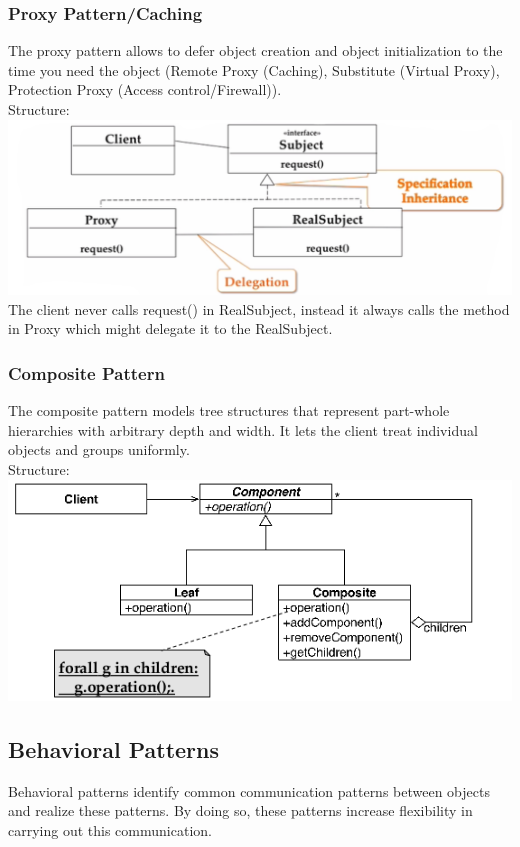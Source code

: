 \subsubsection{Proxy Pattern/Caching}
The proxy pattern allows to defer object creation and object initialization to the time you need the object (Remote Proxy (Caching), Substitute (Virtual Proxy), Protection Proxy (Access control/Firewall)).\\
Structure:\\
\includegraphics[width=\linewidth]{images/pattern_proxy.png}
The client never calls request() in RealSubject, instead it always calls the method in Proxy which might delegate it to the RealSubject.
\newpage

\subsubsection{Composite Pattern}
The composite pattern models tree structures that represent part-whole hierarchies with arbitrary depth and width.
It lets the client treat individual objects and groups uniformly. \\
Structure:\\
\includegraphics[width=\linewidth]{images/pattern_composite.png}
\newpage


\subsection{Behavioral Patterns}
Behavioral patterns identify common communication patterns between objects and realize these patterns. By doing so, these patterns increase flexibility in carrying out this communication. %

